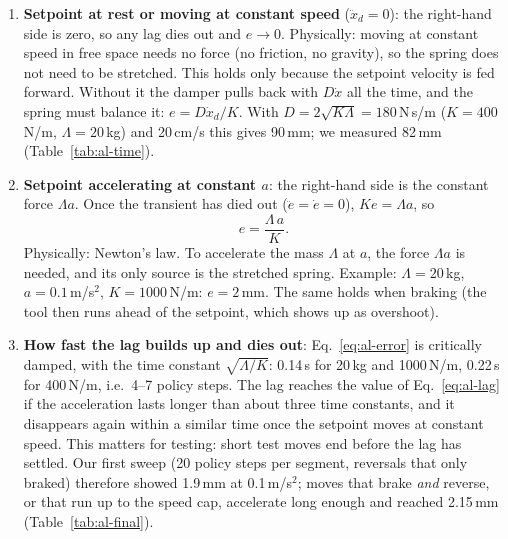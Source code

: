 \begin{enumerate}
  \item \textbf{Setpoint at rest or moving at constant speed} ($\ddot x_d = 0$): the right-hand side is zero, so any lag
        dies out and $e \to 0$. Physically: moving at constant speed in free space needs no force (no friction, no
        gravity), so the spring does not need to be stretched. This holds only because the setpoint velocity is fed
        forward. Without it the damper pulls back with $D\dot x$ all the time, and the spring must balance it:
        $e = D\dot x_d / K$. With $D = 2\sqrt{K\Lambda} = 180$\,N\,s/m ($K = 400$\,N/m, $\Lambda = 20$\,kg) and
        20\,cm/s this gives 90\,mm; we measured 82\,mm (Table~\ref{tab:al-time}).
  \item \textbf{Setpoint accelerating at constant $a$}: the right-hand side is the constant force $\Lambda a$. Once the
        transient has died out ($\ddot e = \dot e = 0$), $K e = \Lambda a$, so
        \begin{equation}
          e = \frac{\Lambda\, a}{K}.
          \label{eq:al-lag}
        \end{equation}
        Physically: Newton's law. To accelerate the mass $\Lambda$ at $a$, the force $\Lambda a$ is needed, and its only
        source is the stretched spring. Example: $\Lambda = 20$\,kg, $a = 0.1$\,m/s$^2$, $K = 1000$\,N/m: $e = 2$\,mm.
        The same holds when braking (the tool then runs ahead of the setpoint, which shows up as overshoot).
  \item \textbf{How fast the lag builds up and dies out}: Eq.~\eqref{eq:al-error} is critically damped, with the time
        constant $\sqrt{\Lambda/K}$: 0.14\,s for 20\,kg and 1000\,N/m, 0.22\,s for 400\,N/m, i.e.\ 4--7 policy steps.
        The lag reaches the value of Eq.~\eqref{eq:al-lag} if the acceleration lasts longer than about three time
        constants, and it disappears again within a similar time once the setpoint moves at constant speed. This
        matters for testing: short test moves end before the lag has settled. Our first sweep (20 policy steps per
        segment, reversals that only braked) therefore showed 1.9\,mm at 0.1\,m/s$^2$; moves that brake \emph{and}
        reverse, or that run up to the speed cap, accelerate long enough and reached 2.15\,mm
        (Table~\ref{tab:al-final}).
\end{enumerate}

